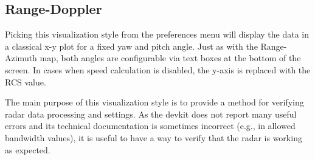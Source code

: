 \subsection{Range-Doppler}

Picking this visualization style from the preferences menu will display the data in a classical x-y plot for a fixed yaw and pitch angle.
Just as with the Range-Azimuth map, both angles are configurable via text boxes at the bottom of the screen.
In cases when speed calculation is disabled, the y-axis is replaced with the RCS value.

The main purpose of this visualization style is to provide a method for verifying radar data processing and settings.
As the devkit does not report many useful errors and its technical documentation is sometimes incorrect (e.g., in allowed bandwidth values), it is useful to have a way to verify that the radar is working as expected.

